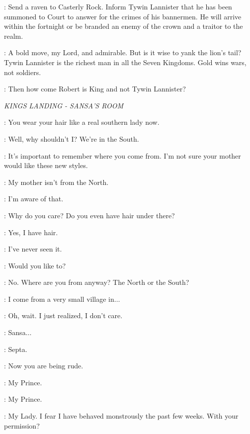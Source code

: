 \NED:  Send a raven to Casterly Rock. Inform Tywin Lannister that he has been summoned to Court to answer for the crimes of his bannermen. He will arrive within the fortnight or be branded an enemy of the crown and a traitor to the realm. 


\LITTLEFINGER: A bold move, my Lord, and admirable. But is it wise to yank the lion's tail? Tywin Lannister is the richest man in all the Seven Kingdoms.  Gold wins wars, not soldiers.

\NED:  Then how come Robert is King and not Tywin Lannister?  


\scene

\textit{KINGS LANDING - SANSA'S ROOM} 


\SEPTAMORDANE:  You wear your hair like a real southern lady now. 

\SANSA:  Well, why shouldn't I? We're in the South. 

\SEPTAMORDANE:  It's important to remember where you come from. I'm not sure your mother would like these new styles. 

\SANSA:  My mother isn't from the North. 

\SEPTAMORDANE:  I'm aware of that. 

\SANSA: Why do you care? Do you even have hair under there? 

\SEPTAMORDANE:  Yes, I have hair. 

\SANSA:  I've never seen it. 

\SEPTAMORDANE:  Would you like to? 

\SANSA:  No. Where are you from anyway? The North or the South? 

\SEPTAMORDANE:  I come from a very small village in$\ldots$ 

\SANSA:  Oh, wait. I just realized, I don't care. 

\SEPTAMORDANE:  Sansa$\ldots$ 

\SANSA:  Septa. 

\SEPTAMORDANE: Now you are being rude.


\SEPTAMORDANE:  My Prince. 

\SANSA: My Prince. 

\JOFFREY: My Lady. I fear I have behaved monstrously the past few weeks.  With your permission? 

